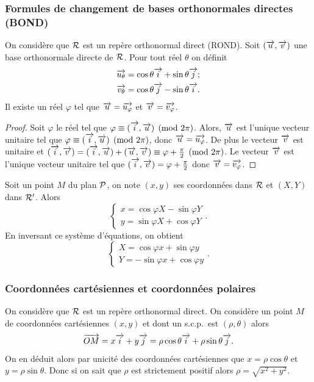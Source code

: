 \subsubsection{Formules de changement de bases orthonormales directes (BOND)}
\label{subsubsec:formuledechangementdeBOND}
On considère que \(\Rep\) est un repère orthonormal direct (ROND). Soit \((\vu,\vv)\) une base orthonormale directe de \(\Rep\). Pour tout réel \(\theta\) on définit
\begin{align}
 \vect{u_\theta}&=\cos \theta \vi + \sin \theta \vj; \\
 \vect{v_\theta}&=\cos \theta \vj -\sin \theta \vi .
\end{align}
Il existe un réel \(\varphi\) tel que \(\vu=\vect{u_\varphi}\) et \(\vv=\vect{v_\varphi}\).
\begin{proof}
  Soit \(\varphi\) le réel tel que \(\congru{\varphi}{(\vi,\vu)}{2\pi}\). Alors, \(\vu\) est l'unique vecteur unitaire tel que \(\congru{\varphi}{(\vi,\vu)}{2\pi}\), donc \(\vu=\vect{u_\varphi}\). De plus le vecteur \(\vv\) est unitaire et \((\vi,\vv)=\congru{(\vi,\vu)+(\vu,\vv)}{\varphi+\frac{\pi}{2}}{2\pi}\). Le vecteur \(\vv\) est l'unique vecteur unitaire tel que \((\vi,\vv)=\varphi+\frac{\pi}{2}\) donc \(\vv=\vect{v_\varphi}\).
\end{proof}
Soit un point \(M\) du plan \(\P\), on note \((x,y)\) ses coordonnées dans \(\Rep\) et \((X,Y)\) dans \(\Rep'\). Alors
\begin{equation}
  \begin{cases}
    x=\cos \varphi X - \sin \varphi Y \\
    y=\sin \varphi X + \cos \varphi Y
  \end{cases}.
\end{equation}
En inversant ce système d'équations, on obtient
\begin{equation}
  \begin{cases}
    X=\cos \varphi x + \sin \varphi y\\
    Y=-\sin \varphi x + \cos \varphi y
  \end{cases}.
\end{equation}
%
\subsubsection{Coordonnées cartésiennes et coordonnées polaires}
\label{subsubsec:coordpoletcoordcart}
On considère que \(\Rep\) est un repère orthonormal direct. On considère un point \(M\) de coordonnées cartésiennes \((x,y)\) et dont un s.c.p.\ est \((\rho,\theta)\) alors
\begin{equation}
 \vect{OM}=x \vi+y\vj=\rho \cos \theta \vi + \rho \sin \theta \vj.
\end{equation}
On en déduit alors par unicité des coordonnées cartésiennes que \(x=\rho \cos \theta\) et \(y=\rho \sin \theta\). Donc si on sait que \(\rho\) est strictement positif alors \(\rho=\sqrt{x^2+y^2}\).
%
